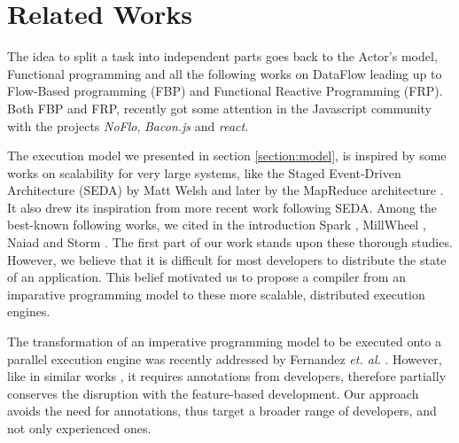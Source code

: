 \section{Related Works} \label{section:related}

The idea to split a task into independent parts goes back to the Actor's model, Functional programming and all the following works on DataFlow leading up to Flow-Based programming (FBP) and Functional Reactive Programming (FRP).
Both FBP and FRP, recently got some attention in the Javascript community with the projects \textit{NoFlo}, \textit{Bacon.js} and \textit{react}.

The execution model we presented in section \ref{section:model}, is inspired by some works on scalability for very large systems, like the Staged Event-Driven Architecture (SEDA) by Matt Welsh \cite{Welsh2000} and later by the MapReduce architecture \cite{Dean2008}.
It also drew its inspiration from more recent work following SEDA.
Among the best-known following works, we cited in the introduction Spark \cite{Zaharia2012}, MillWheel \cite{Akidau2013}, Naiad \cite{McSherry} and Storm \cite{Toshniwal2014}.
The first part of our work stands upon these thorough studies.
However, we believe that it is difficult for most developers to distribute the state of an application.
This belief motivated us to propose a compiler from an imparative programming model to these more scalable, distributed execution engines.


The transformation of an imperative programming model to be executed onto a parallel execution engine was recently addressed by Fernandez \textit{et. al.} \cite{Fernandez2014a}.
However, like in similar works \cite{Power2010}, it requires annotations from developers, therefore partially conserves the disruption with the feature-based development.
Our approach avoids the need for annotations, thus target a broader range of developers, and not only experienced ones.

